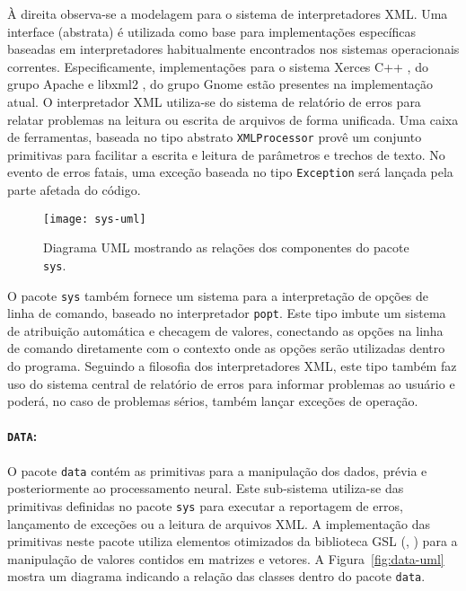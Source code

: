 À direita observa-se a modelagem para o sistema de interpretadores XML. Uma
interface (abstrata) é utilizada como base para implementações específicas
baseadas em interpretadores habitualmente encontrados nos sistemas
operacionais correntes. Especificamente, implementações para o sistema Xerces
C++ \cite{xerces-c}, do grupo Apache e libxml2 \cite{libxml2}, do grupo Gnome
estão presentes na implementação atual. O interpretador XML utiliza-se do
sistema de relatório de erros para relatar problemas na leitura ou escrita de
arquivos de forma unificada. Uma caixa de ferramentas, baseada no tipo
abstrato \texttt{XMLProcessor} provê um conjunto primitivas para facilitar a
escrita e leitura de parâmetros e trechos de texto. No evento de erros fatais,
uma exceção baseada no tipo \texttt{Exception} será lançada pela parte afetada
do código.

\begin{figure}
\begin{center}
\texttt{[image: sys-uml]}
\end{center}
\caption{Diagrama UML mostrando as relações dos componentes do pacote
\texttt{sys}.}
\label{fig:sys-uml}
\end{figure}

O pacote \texttt{sys} também fornece um sistema para a interpretação de opções
de linha de comando, baseado no interpretador \texttt{popt}. Este tipo imbute
um sistema de atribuição automática e checagem de valores, conectando as
opções na linha de comando diretamente com o contexto onde as opções serão
utilizadas dentro do programa. Seguindo a filosofia dos interpretadores XML,
este tipo também faz uso do sistema central de relatório de erros para
informar problemas ao usuário e poderá, no caso de problemas sérios, também
lançar exceções de operação.

\paragraph{\texttt{DATA}:} O pacote \texttt{data} contém as primitivas para a
manipulação dos dados, prévia e posteriormente ao processamento neural. Este
sub-sistema utiliza-se das primitivas definidas no pacote \texttt{sys} para
executar a reportagem de erros, lançamento de exceções ou a leitura de
arquivos XML. A implementação das primitivas neste pacote utiliza elementos
otimizados da biblioteca GSL (, \cite{gsl}) para a
manipulação de valores contidos em matrizes e vetores. A
Figura~\ref{fig:data-uml} mostra um diagrama indicando a relação das classes
dentro do pacote \texttt{data}.

